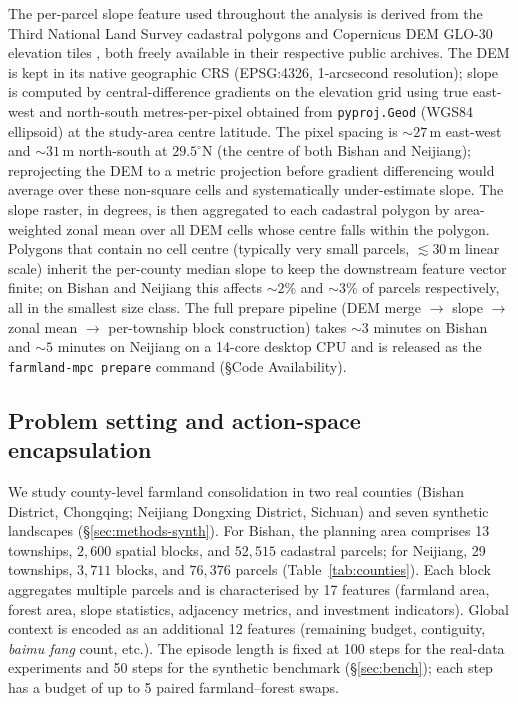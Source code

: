\documentclass[11pt]{article}
\begin{document}
The per-parcel slope feature used throughout the analysis is derived from the Third National Land Survey cadastral polygons and Copernicus DEM GLO-30 elevation tiles \citep{copernicus2021dem}, both freely available in their respective public archives. The DEM is kept in its native geographic CRS (EPSG:4326, 1-arcsecond resolution); slope is computed by central-difference gradients on the elevation grid using true east-west and north-south metres-per-pixel obtained from \texttt{pyproj.Geod} (WGS84 ellipsoid) at the study-area centre latitude. The pixel spacing is $\sim$$27$\,m east-west and $\sim$$31$\,m north-south at $29.5^\circ$N (the centre of both Bishan and Neijiang); reprojecting the DEM to a metric projection before gradient differencing would average over these non-square cells and systematically under-estimate slope. The slope raster, in degrees, is then aggregated to each cadastral polygon by area-weighted zonal mean over all DEM cells whose centre falls within the polygon. Polygons that contain no cell centre (typically very small parcels, $\lesssim 30$\,m linear scale) inherit the per-county median slope to keep the downstream feature vector finite; on Bishan and Neijiang this affects $\sim$$2$\% and $\sim$$3$\% of parcels respectively, all in the smallest size class. The full prepare pipeline (DEM merge $\to$ slope $\to$ zonal mean $\to$ per-township block construction) takes $\sim$$3$ minutes on Bishan and $\sim$$5$ minutes on Neijiang on a 14-core desktop CPU and is released as the \texttt{farmland-mpc prepare} command (\S Code Availability).

\subsection*{Problem setting and action-space encapsulation}\label{sec:methods-action}

We study county-level farmland consolidation in two real counties (Bishan District, Chongqing; Neijiang Dongxing District, Sichuan) and seven synthetic landscapes (\S\ref{sec:methods-synth}). For Bishan, the planning area comprises 13 townships, $2{,}600$ spatial blocks, and $52{,}515$ cadastral parcels; for Neijiang, 29 townships, $3{,}711$ blocks, and $76{,}376$ parcels (Table~\ref{tab:counties}). Each block aggregates multiple parcels and is characterised by 17 features (farmland area, forest area, slope statistics, adjacency metrics, and investment indicators). Global context is encoded as an additional 12 features (remaining budget, contiguity, \textit{baimu fang} count, etc.). The episode length is fixed at 100 steps for the real-data experiments and 50 steps for the synthetic benchmark (\S\ref{sec:bench}); each step has a budget of up to 5 paired farmland--forest swaps.
\end{document}
